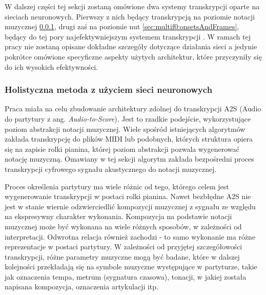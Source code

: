 \documentclass[12pt,a4paper,twoside]{mwart}
\begin{document}

W dalszej części tej sekcji zostaną omówione dwa systemy transkrypcji oparte na sieciach neuronowych. Pierwszy z nich będący transkrypcją na poziomie notacji muzycznej \ref{sec:multif0:petrusNetwork}, drugi zaś na poziomie nut \ref{sec:multif0:onsetsAndFrames}, będący do tej pory najefektywniejszym systemem transkrypcji 
\cite[27]{DBLP:journals/spm/BenetosDDE19}
. W ramach tej pracy nie zostaną opisane dokładne szczegóły dotyczące działania sieci a jedynie pokrótce omówione specyficzne aspekty użytych architektur, które przyczyniły się do ich wysokich efektywności.


\subsubsection{Holistyczna metoda z użyciem sieci neuronowych}\label{sec:multif0:petrusNetwork}
Praca \cite{Transcription:Pertus:NeuralNetwork} miała na celu zbudowanie architektury zdolnej do transkrypcji A2S (Audio do partytury z ang. \textit{Audio-to-Score}). Jest to rzadkie podejście, wykorzystujące poziom abstrakcji notacji muzycznej. Wiele spośród istniejących algorytmów zakłada transkrypcję do plików MIDI lub podobnych, których struktura opiera się na zapisie rolki pianina, której poziom abstrakcji pozwala wygenerować notację muzyczną. Omawiany w tej sekcji algorytm zakłada bezpośredni proces transkrypcji cyfrowego sygnału akustycznego do notacji muzycznej.

Proces określenia partytury ma wiele różnic od tego, którego celem jest wygenerowanie transkrypcji w postaci rolki pianina. Nawet bezbłędne A2S nie jest w stanie wiernie odzwierciedlić kompozycji muzycznej z sygnału ze względu na ekspresywny charakter wykonania. Kompozycja na podstawie notacji muzycznej może być wykonana na wiele różnych sposobów, w zależności od interpretacji. Odwrotna relacja również zachodzi - to samo wykonanie ma różne reprezentacje w postaci partytury. W zależności od przyjętej szczegółowości transkrypcji, różne parametry muzyczne mogą być badane, które w dalszej kolejności przekładają się na symbole muzyczne występujące w partyturze, takie jak oznaczenia tempa, metrum (sygnatura czasowa), tonacji, w jakiej została napisana kompozycja, oznaczenia artykulacji itp.
\end{document}
